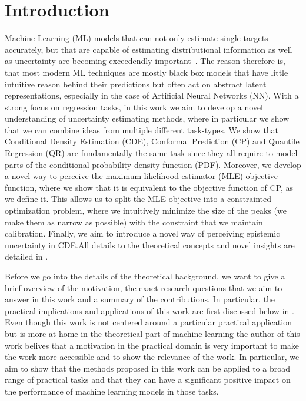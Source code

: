 
\chapter{Introduction}\label{chap:introduction}

Machine Learning (ML) models that can not only estimate single targets accurately, but that are capable of estimating distributional information as well as uncertainty are becoming exceedendly important~\cite{hullermeier_aleatoric_2021, gawlikowski2023survey}. The reason therefore is, that most modern ML techniques are mostly black box models that have little intuitive reason behind their predictions but often act on abstract latent representations, especially in the case of Artificial Neural Networks (NN). With a strong focus on regression tasks, in this work we aim to develop a novel understanding of uncertainty estimating methods, where in particular we show that we can combine ideas from multiple different task-types. We show that Conditional Density Estimation (CDE), Conformal Prediction (CP) and Quantile Regression (QR) are fundamentally the same task since they all require to model parts of the conditional probability density function (PDF). Moreover, we develop a novel way to perceive the maximum likelihood estimator (MLE) objective function, where we show that it is equivalent to the objective function of CP, as we define it. This allows us to split the MLE objective into a constrainted optimization problem, where we intuitively minimize the size of the peaks (we make them as narrow as possible) with the constraint that we maintain calibration. Finally, we aim to introduce a novel way of perceiving epistemic uncertainty in CDE.\@ All details to the theoretical concepts and novel insights are detailed in .

Before we go into the details of the theoretical background, we want to give a brief overview of the motivation, the exact research questions that we aim to answer in this work and a summary of the contributions. In particular, the practical implications and applications of this work are first discussed below in . Even though this work is not centered around a particular practical application but is more at home in the theoretical part of machine learning the author of this work belives that a motivation in the practical domain is very important to make the work more accessible and to show the relevance of the work. In particular, we aim to show that the methods proposed in this work can be applied to a broad range of practical tasks and that they can have a significant positive impact on the performance of machine learning models in those tasks.

